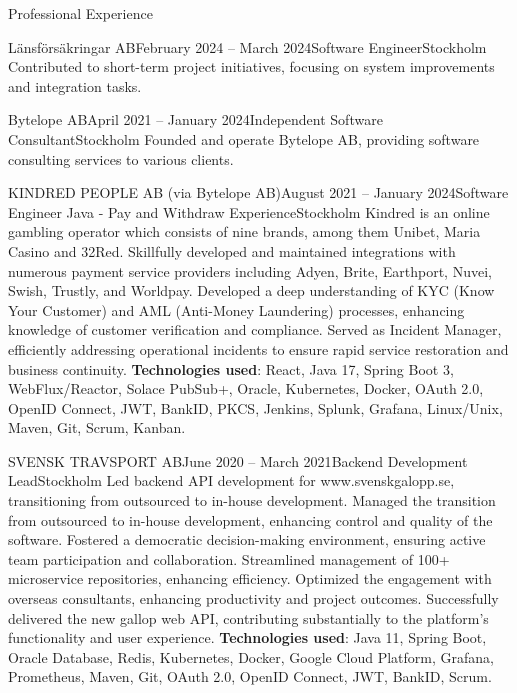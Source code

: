 \documentclass{resume}
\begin{document}
\begin{rSection}{Professional Experience}
\begin{rSubsection}{Länsförsäkringar AB}{February 2024 -- March 2024}{Software Engineer}{Stockholm}
\bItem Contributed to short-term project initiatives, focusing on system improvements and integration tasks.
\end{rSubsection}

\begin{rSubsection}{Bytelope AB}{April 2021 -- January 2024}{Independent Software Consultant}{Stockholm}
\bItem Founded and operate Bytelope AB, providing software consulting services to various clients.
\end{rSubsection}

\begin{rSubsection}{KINDRED PEOPLE AB (via Bytelope AB)}{August 2021 -- January 2024}{Software Engineer Java - Pay and Withdraw Experience}{Stockholm}
\bItem Kindred is an online gambling operator which consists of nine brands, among them Unibet, Maria Casino and 32Red.
\bItem Skillfully developed and maintained integrations with numerous payment service providers including Adyen, Brite, Earthport, Nuvei, Swish, Trustly, and Worldpay.
\bItem Developed a deep understanding of KYC (Know Your Customer) and AML (Anti-Money Laundering) processes, enhancing knowledge of customer verification and compliance.
\bItem Served as Incident Manager, efficiently addressing operational incidents to ensure rapid service restoration and business continuity.
\bItem \textbf{Technologies used}: React, Java 17, Spring Boot 3, WebFlux/Reactor, Solace PubSub+, Oracle, Kubernetes, Docker, OAuth 2.0, OpenID Connect, JWT, BankID, PKCS, Jenkins, Splunk, Grafana, Linux/Unix, Maven, Git, Scrum, Kanban.
\end{rSubsection}

\begin{rSubsection}{SVENSK TRAVSPORT AB}{June 2020 -- March 2021}{Backend Development Lead}{Stockholm}
\bItem Led backend API development for www.svenskgalopp.se, transitioning from outsourced to in-house development.
\bItem Managed the transition from outsourced to in-house development, enhancing control and quality of the software.
\bItem Fostered a democratic decision-making environment, ensuring active team participation and collaboration.
\bItem Streamlined management of 100+ microservice repositories, enhancing efficiency.
\bItem Optimized the engagement with overseas consultants, enhancing productivity and project outcomes.
\bItem Successfully delivered the new gallop web API, contributing substantially to the platform's functionality and user experience.
\bItem \textbf{Technologies used}: Java 11, Spring Boot, Oracle Database, Redis, Kubernetes, Docker, Google Cloud Platform, Grafana, Prometheus, Maven, Git, OAuth 2.0, OpenID Connect, JWT, BankID, Scrum.
\end{rSubsection}


\end{rSection}
\end{document}
